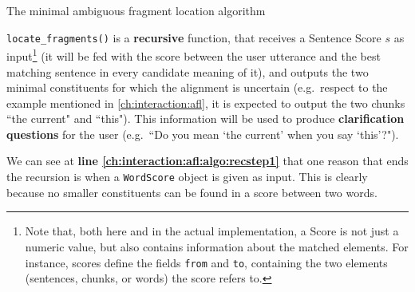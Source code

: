 \begin{algorithm}

  
\caption{The minimal ambiguous fragment location algorithm\label{ch:interaction:afl:algo}}
\end{algorithm}

\texttt{locate\_fragments()} is a \textbf{recursive} function, that receives a Sentence Score $s$ as input\footnote{Note that, both here and in the actual implementation, a Score is not just a numeric value, but also contains information about the matched elements. For instance, scores define the fields \texttt{from} and \texttt{to}, containing the two elements (sentences, chunks, or words) the score refers to.} (it will be fed with the score between the user utterance and the best matching sentence in every candidate meaning of it), and outputs the two minimal constituents for which the alignment is uncertain (e.g.\ respect to the example mentioned in \ref{ch:interaction:afl}, it is expected to output the two chunks ``the current" and ``this"). This information will be used to produce \textbf{clarification questions} for the user (e.g.\ ``Do you mean `the current' when you say `this'?").

We can see at \textbf{line \ref{ch:interaction:afl:algo:recstep1}} that one reason that ends the recursion is when a \texttt{WordScore} object is given as input. This is clearly because no smaller constituents can be found in a score between two words.

